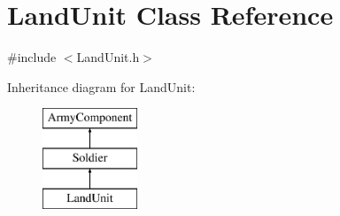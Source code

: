 \hypertarget{class_land_unit}{}\section{Land\+Unit Class Reference}
\label{class_land_unit}


{\ttfamily \#include $<$Land\+Unit.\+h$>$}

Inheritance diagram for Land\+Unit\+:\begin{figure}[H]
\begin{center}
\leavevmode
\includegraphics[height=3.000000cm]{class_land_unit}
\end{center}
\end{figure}
